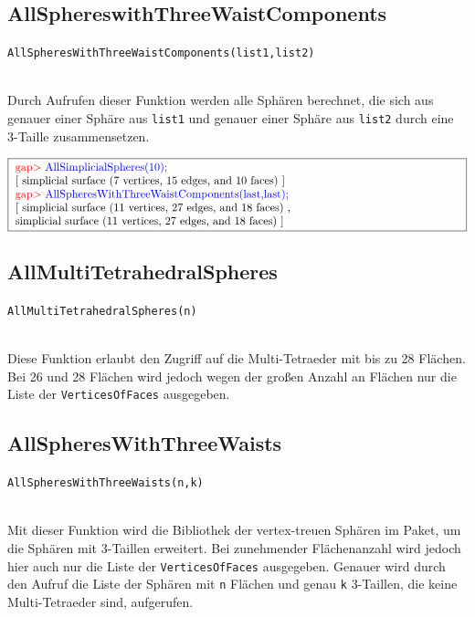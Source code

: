 \documentclass[12pt,titlepage,twoside,cleardoublepage]{article}
\theoremstyle{nummermitklammern}
\numberwithin{equation}{section}
\begin{document}
\subsection{AllSphereswithThreeWaistComponents}
\begin{large}
\texttt{AllSpheresWithThreeWaistComponents(list1,list2)}
\end{large}\\
Durch Aufrufen dieser Funktion werden alle Sphären berechnet, die sich aus genauer einer Sphäre aus \texttt{list1} und genauer einer Sphäre aus \texttt{list2} durch eine 3-Taille zusammensetzen.
\begin{center}
$\fbox{
\parbox{14cm}{
\textcolor{red}{gap$>$} \textcolor{blue}{AllSimplicialSpheres(10);}\newline
[ simplicial surface (7 vertices, 15 edges, and 10 faces) ]\newline
\textcolor{red}{gap$>$} \textcolor{blue}{AllSpheresWithThreeWaistComponents(last,last);}\newline
[ simplicial surface (11 vertices, 27 edges, and 18 faces)
    ,\newline
  simplicial surface (11 vertices, 27 edges, and 18 faces)
 ]
}
}$
\end{center}
\subsection{AllMultiTetrahedralSpheres}
\begin{large}
\texttt{AllMultiTetrahedralSpheres(n)}
\end{large}\\
Diese Funktion erlaubt den Zugriff auf die Multi-Tetraeder mit bis zu 28 Flächen. Bei 26 und 28 Flächen wird jedoch wegen der großen Anzahl an Flächen nur die Liste der \texttt{VerticesOfFaces} ausgegeben.
\subsection{AllSpheresWithThreeWaists}
\begin{large}
\texttt{AllSpheresWithThreeWaists(n,k)}
\end{large}\\
Mit dieser Funktion wird die Bibliothek der vertex-treuen Sphären im Paket, um die Sphären mit 3-Taillen erweitert.  Bei zunehmender Flächenanzahl wird jedoch hier auch nur die Liste der \texttt{VerticesOfFaces} ausgegeben. Genauer wird durch den Aufruf die Liste der Sphären mit \texttt{n} Flächen und genau \texttt{k} 3-Taillen, die keine Multi-Tetraeder sind, aufgerufen.
\end{document}
